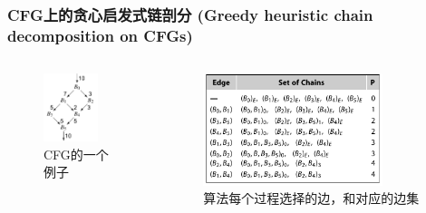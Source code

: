 \begin{frame}
    \frametitle{CFG上的贪心启发式链剖分 (Greedy heuristic chain decomposition on CFGs)}

    \begin{columns}
        \begin{column}{0.3\textwidth}
            \begin{figure}
                \centering
                \includegraphics[width=0.8\textwidth]{images/example_cfg.png}
                \caption{CFG的一个例子\cite{cooper2011engineering}}
            \end{figure}
        \end{column}
        \begin{column}{0.6\textwidth}
            \begin{figure}
                \centering
                \includegraphics[width=0.8\textwidth]{images/greedy.png}
                \caption{算法每个过程选择的边，和对应的边集}
            \end{figure}
        \end{column}
    \end{columns}

\end{frame}


